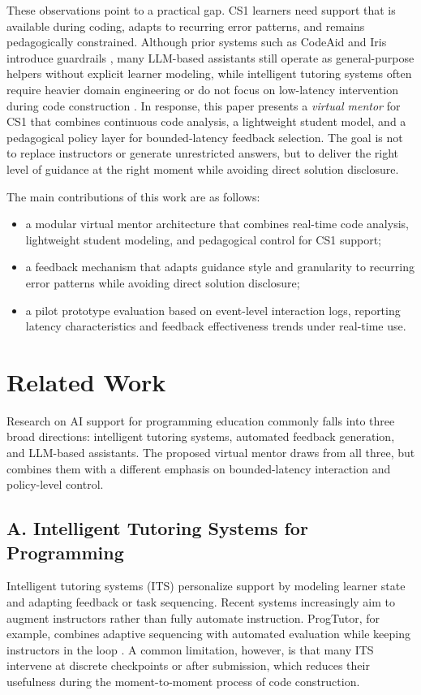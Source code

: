 \documentclass[conference]{IEEEtran}
\begin{document}
These observations point to a practical gap. CS1 learners need support that is available during coding, adapts to recurring error patterns, and remains pedagogically constrained. Although prior systems such as CodeAid and Iris introduce guardrails \cite{CodeAid,IRIS}, many LLM-based assistants still operate as general-purpose helpers without explicit learner modeling, while intelligent tutoring systems often require heavier domain engineering or do not focus on low-latency intervention during code construction \cite{ProgTutor}. In response, this paper presents a \emph{virtual mentor} for CS1 that combines continuous code analysis, a lightweight student model, and a pedagogical policy layer for bounded-latency feedback selection. The goal is not to replace instructors or generate unrestricted answers, but to deliver the right level of guidance at the right moment while avoiding direct solution disclosure.

The main contributions of this work are as follows:
\begin{itemize}
\item a modular virtual mentor architecture that combines real-time code analysis, lightweight student modeling, and pedagogical control for CS1 support;
\item a feedback mechanism that adapts guidance style and granularity to recurring error patterns while avoiding direct solution disclosure;
\item a pilot prototype evaluation based on event-level interaction logs, reporting latency characteristics and feedback effectiveness trends under real-time use.
\end{itemize}

\section{Related Work}

Research on AI support for programming education commonly falls into three broad directions: intelligent tutoring systems, automated feedback generation, and LLM-based assistants. The proposed virtual mentor draws from all three, but combines them with a different emphasis on bounded-latency interaction and policy-level control.

\subsection*{A. Intelligent Tutoring Systems for Programming}

Intelligent tutoring systems (ITS) personalize support by modeling learner state and adapting feedback or task sequencing. Recent systems increasingly aim to augment instructors rather than fully automate instruction. ProgTutor, for example, combines adaptive sequencing with automated evaluation while keeping instructors in the loop \cite{ProgTutor}. A common limitation, however, is that many ITS intervene at discrete checkpoints or after submission, which reduces their usefulness during the moment-to-moment process of code construction.
\end{document}
